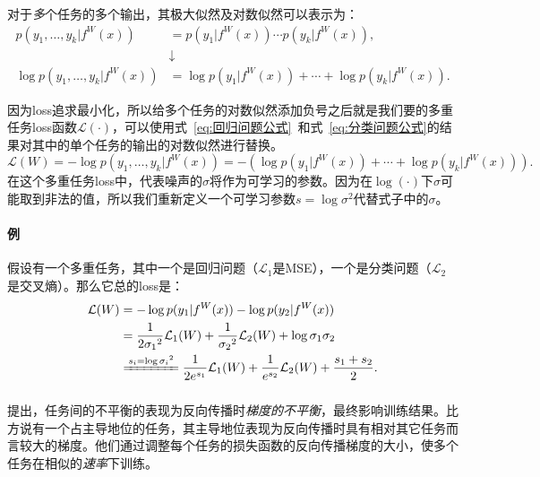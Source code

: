 \documentclass{ctexart}
\begin{document}
对于\emph{多}个任务的多个输出，其极大似然及对数似然可以表示为：
\begin{equation}
    \begin{aligned}
        p(y_1, \ldots, y_k|f^W(x)) &= p(y_1 | f^W(x)) \cdots p(y_k | f^W(x)), \\
        &\downarrow \\
        \log p(y_1, \ldots, y_k|f^W(x)) &= \log p(y_1 | f^W(x)) + \cdots + \log p(y_k | f^W(x)).
    \end{aligned}
\end{equation}

因为loss追求最小化，所以给多个任务的对数似然添加负号之后就是我们要的多重任务loss函数$\mathcal{L}(\cdot)$，可以使用式~\ref{eq:回归问题公式}~和式~\ref{eq:分类问题公式}的结果对其中的单个任务的输出的对数似然进行替换。
\begin{equation}
    \mathcal{L}(W) = - \log p(y_1, \ldots, y_k|f^W(x)) = - (\log p(y_1 | f^W(x)) + \cdots + \log p(y_k | f^W(x))).
\end{equation}
在这个多重任务loss中，代表噪声的$\sigma$将作为可学习的参数。因为在$\log(\cdot)$下$\sigma$可能取到非法的值，所以我们重新定义一个可学习参数$s=\log \sigma^2$代替式子中的$\sigma$。

\paragraph{例} 假设有一个多重任务，其中一个是回归问题（$\mathcal{L}_1$是MSE），一个是分类问题（$\mathcal{L}_2$是交叉熵）。那么它总的loss是：
\begin{equation}
    \begin{aligned}
        \mathcal{L}(W) &= - \log p(y_1|f^W(x)) - \log p(y_2|f^W(x)) \\
         &= \frac{1}{2{\sigma_1}^2} \mathcal{L}_1(W) + \frac{1}{{\sigma_2}^2} \mathcal{L}_2(W) + \log \sigma_1\sigma_2 \\
         &\xlongequal{s_i =\log {\sigma_i}^2} \frac{1}{2{e}^{s_1}} \mathcal{L}_1(W) + \frac{1}{{e}^{s_2}} \mathcal{L}_2(W) + \frac{s_1 + s_2}{2}.
    \end{aligned}
\end{equation}

\subsubsection{}

\citet{Chen18GradNorm}提出，任务间的不平衡的表现为反向传播时\emph{梯度的不平衡}，最终影响训练结果。比方说有一个占主导地位的任务，其主导地位表现为反向传播时具有相对其它任务而言较大的梯度。他们通过调整每个任务的损失函数的反向传播梯度的大小，使多个任务在相似的\emph{速率}下训练。
\end{document}
